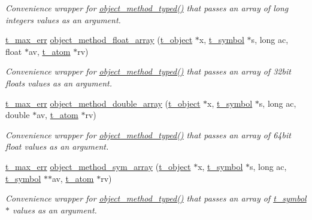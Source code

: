 \begin{DoxyCompactItemize}
\begin{DoxyCompactList}\small\item\em Convenience wrapper for \hyperlink{group__obj_ga443dee482af22e0fe83e68955d367226}{object\_\-method\_\-typed()} that passes an array of long integers values as an argument. \item\end{DoxyCompactList}\item 
\hyperlink{group__datatypes_ga73edaae82b318855cc09fac994918165}{t\_\-max\_\-err} \hyperlink{group__obj_ga308d41d63efacb1187ace7d3b50b99e1}{object\_\-method\_\-float\_\-array} (\hyperlink{structt__object}{t\_\-object} $\ast$x, \hyperlink{structt__symbol}{t\_\-symbol} $\ast$s, long ac, float $\ast$av, \hyperlink{structt__atom}{t\_\-atom} $\ast$rv)
\begin{DoxyCompactList}\small\item\em Convenience wrapper for \hyperlink{group__obj_ga443dee482af22e0fe83e68955d367226}{object\_\-method\_\-typed()} that passes an array of 32bit floats values as an argument. \item\end{DoxyCompactList}\item 
\hyperlink{group__datatypes_ga73edaae82b318855cc09fac994918165}{t\_\-max\_\-err} \hyperlink{group__obj_gaaa262193055c44fff144e3395443597a}{object\_\-method\_\-double\_\-array} (\hyperlink{structt__object}{t\_\-object} $\ast$x, \hyperlink{structt__symbol}{t\_\-symbol} $\ast$s, long ac, double $\ast$av, \hyperlink{structt__atom}{t\_\-atom} $\ast$rv)
\begin{DoxyCompactList}\small\item\em Convenience wrapper for \hyperlink{group__obj_ga443dee482af22e0fe83e68955d367226}{object\_\-method\_\-typed()} that passes an array of 64bit float values as an argument. \item\end{DoxyCompactList}\item 
\hyperlink{group__datatypes_ga73edaae82b318855cc09fac994918165}{t\_\-max\_\-err} \hyperlink{group__obj_ga2a4bb953a5f7a9afee4f2f8196c4226e}{object\_\-method\_\-sym\_\-array} (\hyperlink{structt__object}{t\_\-object} $\ast$x, \hyperlink{structt__symbol}{t\_\-symbol} $\ast$s, long ac, \hyperlink{structt__symbol}{t\_\-symbol} $\ast$$\ast$av, \hyperlink{structt__atom}{t\_\-atom} $\ast$rv)
\begin{DoxyCompactList}\small\item\em Convenience wrapper for \hyperlink{group__obj_ga443dee482af22e0fe83e68955d367226}{object\_\-method\_\-typed()} that passes an array of \hyperlink{structt__symbol}{t\_\-symbol}$\ast$ values as an argument. \item\end{DoxyCompactList}\item 
$$
\end{DoxyCompactItemize}
